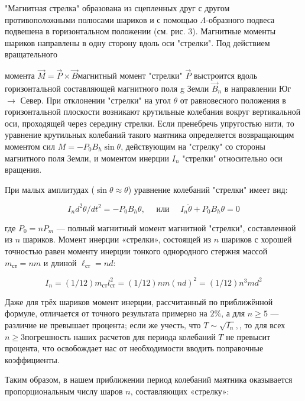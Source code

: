 \documentclass[a4paper, 12pt]{article}
\begin{document}
"Магнитная стрелка" образована из сцепленных друг с другом противоположными полюсами шариков и с помощью $\Lambda$-образного подвеса подвешена в горизонтальном положении (см. рис. 3). Магнитные моменты шариков направлены в одну сторону вдоль оси "стрелки". Под действием вращательного

момента $\vec{M}=\vec{P} \times \vec{B}$магнитный момент "стрелки" $\vec{P}$ выстроится вдоль горизонтальной составляющей магнитного поля g Земли $\vec{B}_n$ в направлении Юг $\rightarrow$ Север. При отклонении "стрелки" на угол $\theta$ от равновесного положения в горизонтальной плоскости возникают крутильные колебания вокруг вертикальной оси, проходящей через середину стрелки. Если пренебречь упругостью нити, то уравнение крутильных колебаний такого маятника определяется возвращающим моментом сил $M=-P_{0} B_{h} \sin \theta$, действующим на "стрелку" со стороны магнитного поля Земли, и моментом инерции $I_n$ "стрелки" относительно оси вращения.

При малых амплитудах ($\sin \theta \approx \theta$) уравнение колебаний
"стрелки" имеет вид:
  \begin{center}
\begin{equation}
I_{n} d^{2} \theta / d t^{2}=-P_{0} B_{h} \theta, \quad \text { или } \quad I_{n} \ddot{\theta}+P_{0} B_{h} \theta=0
\end{equation}
\end{center}
где $P_0 = n P_m$ — полный магнитный момент магнитной
   "стрелки", составленной из $n$ шариков.
Момент инерции «стрелки», состоящей из $n$ шариков с хорошей точностью равен моменту инерции тонкого однородного стержня массой $m_{\text{ст}}=n m$  и длиной $\ell_{\text{ст}}=n d$:

  \begin{center}
\begin{equation}
I_{n}=(1 / 12) m_{\text{ст}} l_{\text{ст}}^{2}=(1 / 12) n m(n d)^{2}=(1 / 12) n^{3} m d^{2}
\end{equation}
\end{center}

Даже для трёх шариков момент инерции, рассчитанный по приближённой формуле, отличается от точного результата примерно на $2 \%$, а для $n \geq 5$ — различие
не превышает процента; если же учесть, что $T \sim \sqrt{I_{n}},$, то для всех $n \geq 3$погрешность наших расчетов для периода колебаний $T$ не превысит процента, что освобождает нас от необходимости вводить поправочные коэффициенты.

Таким образом, в нашем приближении период колебаний маятника оказывается пропорциональным числу шаров $n$, составляющих «стрелку»:
\end{document}
